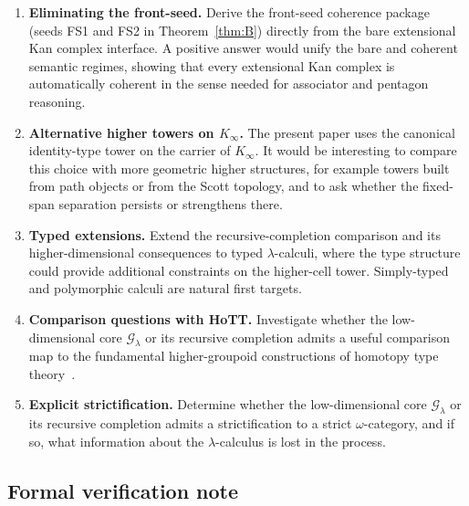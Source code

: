\documentclass[webpdf,traditional,large,numbered]{oup-authoring-template}
\theoremstyle{thmstyleone}%
\theoremstyle{thmstyletwo}%
\theoremstyle{thmstylethree}%
\newcommand{\Kinf}{K_\infty}
\begin{document}
\begin{enumerate}[label=\arabic*., leftmargin=*, labelsep=0.6em]
  \item \textbf{Eliminating the front-seed.}
    Derive the front-seed coherence package (seeds FS1 and FS2 in
    Theorem~\ref{thm:B}) directly from the bare extensional Kan complex interface.
    A positive answer would unify the bare and coherent semantic regimes,
    showing that every extensional Kan complex is automatically coherent
    in the sense needed for associator and pentagon reasoning.

  \item \textbf{Alternative higher towers on $\Kinf$.}
    The present paper uses the canonical identity-type tower on the carrier of
    $\Kinf$.  It would be interesting to compare this choice with more geometric
    higher structures, for example towers built from path objects or from the
    Scott topology, and to ask whether the fixed-span separation persists or
    strengthens there.

  \item \textbf{Typed extensions.}
    Extend the recursive-completion comparison and its higher-dimensional
    consequences to typed $\lambda$-calculi, where the type structure could
    provide additional constraints on the higher-cell tower.  Simply-typed and
    polymorphic calculi are natural first targets.

  \item \textbf{Comparison questions with HoTT.}
    Investigate whether the low-dimensional core $\mathscr{G}_\lambda$ or its
    recursive completion admits a useful comparison map to the fundamental
    higher-groupoid constructions of homotopy type theory~\cite{HoTT}.

  \item \textbf{Explicit strictification.}
    Determine whether the low-dimensional core $\mathscr{G}_\lambda$ or its
    recursive completion admits a strictification to a strict $\omega$-category,
    and if so, what information about the $\lambda$-calculus is lost in the
    process.
\end{enumerate}

\subsection{Formal verification note}
\end{document}
